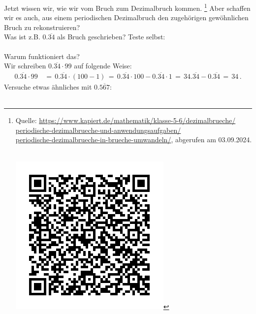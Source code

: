 Jetzt wissen wir, wie wir vom Bruch zum Dezimalbruch kommen.%
\footnote{\begin{minipage}[t]{.85\linewidth}
			Quelle: \url{https://www.kapiert.de/mathematik/klasse-5-6/dezimalbrueche/}\\\url{periodische-dezimalbrueche-und-anwendungsaufgaben/}\\
			\url{periodische-dezimalbrueche-in-brueche-umwandeln/}, abgerufen am 03.09.2024.
		\end{minipage}
		\hfill
		\begin{minipage}[t]{.1\linewidth}
			~\\\vspace{-.8cm}
			\includegraphics[width=\linewidth]{figures/QR-periodischeBrueche}
		\end{minipage}}
Aber schaffen wir es auch, aus einem periodischen Dezimalbruch den zugehörigen gewöhnlichen Bruch zu rekonstruieren?\\

Was ist z.B. $0.\overline{34}$ als Bruch geschrieben?
Teste selbst:\\
\\
Warum funktioniert das?\\
Wir schreiben $0.\overline{34} \cdot 99$ auf folgende Weise:
\begin{align*}
	0.\overline{34} \cdot 99 &\,=\, 0.\overline{34} \cdot (100 - 1)
	\,=\, 0.\overline{34} \cdot 100 - 0.\overline{34} \cdot 1
	\,=\, 34.\overline{34} - 0.\overline{34}
	\,=\, 34\,.
\end{align*}
Versuche etwas ähnliches mit $0.\overline{567}$:\\
\\


